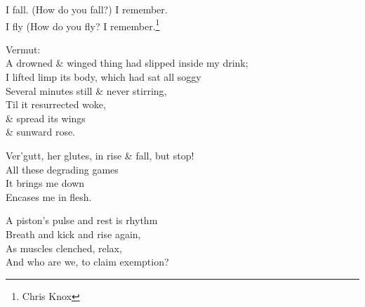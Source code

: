 I fall. (How do you fall?) I remember. \\
I fly  (How do you fly? I remember.\footnote{Chris Knox}

Vermut: \\
A drowned \& winged thing had slipped inside my drink; \\
I lifted limp its body, which had sat all soggy \\
Several minutes still \& never stirring, \\
Til it resurrected woke, \\
\& spread its wings \\
\& sunward rose.

Ver'gutt, her glutes, in rise \& fall, but stop! \\
All these degrading games \\
It brings me down \\
Encases me in flesh.

A piston's pulse and rest is rhythm  \\
Breath and kick and rise again, \\
As muscles clenched, relax, \\
And who are we, to claim exemption?